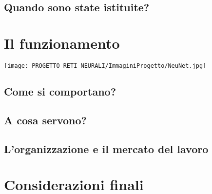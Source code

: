 \documentclass{article}
\begin{document}
\flushleft\subsection{Quando sono state istituite?}

\centering \newpage
\section{Il funzionamento}

 \texttt{[image: PROGETTO RETI NEURALI/ImmaginiProgetto/NeuNet.jpg]}
    \label{F1:foto reti}

\flushleft \subsection{Come si comportano?}

\flushleft \subsection{A cosa servono?}
 
\flushleft \subsection{L'organizzazione e il mercato del lavoro}

\centering \newpage
\section{Considerazioni finali}


\end{document}
